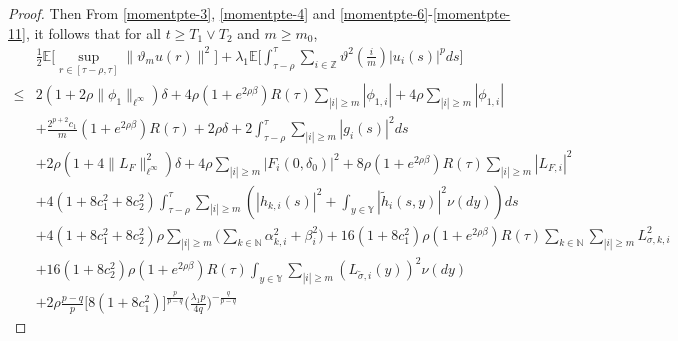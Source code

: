 \documentclass[11pt]{article}
\numberwithin{equation}{section}
\theoremstyle{plain}
\begin{document}
\begin{proof}
 Then From \eqref{momentpte-3}, \eqref{momentpte-4} and \eqref{momentpte-6}-\eqref{momentpte-11},
 it follows that for all $ t \ge T_1 \vee T_2 $ and $ m \ge m_0$,
  \begin{align}\label{momentpte-12}
        & \frac{1}{2} \mathbb{E}
             \Big[ \sup_{r \in [\tau-\rho,\tau]} \|\vartheta_m u(r)\|^2
             \Big]
          + \lambda_1
            \mathbb{E}
               \Big[ \int_{\tau-\rho}^{\tau}
                         \sum_{i \in \mathbb{Z} }
                               {\vartheta}^2(\frac{i}{m}) |u_i(s)|^p ds
               \Big]  \nonumber\\
   \le & 2 \left( 1+ 2\rho \|\phi_1\|_{\ell^\infty} \right) \delta
            + 4 \rho (1 + e^{2\rho\beta}) R(\tau) \sum_{|i| \ge m} |\phi_{1,i}|
            + 4 \rho \sum_{|i| \ge m} |\phi_{1,i}|  \nonumber\\
        & + \frac{2^{p+2} c_1}{m} (1 + e^{2\rho\beta}) R(\tau)
            + 2 \rho \delta
            + 2 \int_{\tau-\rho}^{\tau} \sum_{|i|\ge m} |g_i(s)|^2 ds  \nonumber\\
        & + 2 \rho \left( 1 + 4 \|L_F\|_{\ell^\infty}^2 \right) \delta
            + 4 \rho \sum_{|i| \ge m} | F_i(0,\delta_0)|^2
            + 8 \rho (1 + e^{2\rho\beta}) R(\tau) \sum_{|i| \ge m} |L_{F,i}|^2  \nonumber\\               
        & + 4(1 + 8c_1^2 + 8c_2^2) \int_{\tau-\rho}^{\tau}
                   \sum_{|i| \ge m} 
                         \left( |h_{k,i}(s)|^2 
                                   + \int_{y \in \mathbb{Y} } |\widetilde{h}_i(s,y)|^2 \nu(dy) 
                         \right) ds  \nonumber\\
        & + 4(1 + 8c_1^2 + 8c_2^2) \rho  
               \sum_{|i| \ge m} 
                     \Big( \sum_{k \in \mathbb{N} } \alpha_{k,i}^2 
                               + \beta_i^2
                     \Big)
            + 16(1 + 8c_1^2) \rho (1 + e^{2\rho\beta}) R(\tau)
                       \sum_{k \in \mathbb{N} }
                             \sum_{|i| \ge m} L_{\sigma,k,i}^2   \nonumber\\
        & + 16(1 + 8c_2^2) \rho (1 + e^{2\rho\beta}) R(\tau)
                       \int_{y \in \mathbb{Y} } 
                            \sum_{|i| \ge m} 
                                    \left( L_{\tilde{\sigma}, i}(y) \right)^2 \nu(dy)  \nonumber\\
        & + 2\rho \frac{p-q}{p} 
                      \Big[ 8(1 + 8c_1^2) \Big]^{ \frac{p}{p-q} }
                      \Big( \frac{\lambda_1 p}{4q} \Big)^{-\frac{q}{p-q} }

\end{align}
\end{proof}
\end{document}
